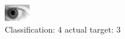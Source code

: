\begin{figure}[h!]
\begin{center}
\includegraphics[width=0.60\columnwidth]{figures/ID305_class_4_target_3.png}
\end{center}
\caption{ Classification: 4 actual target: 3}
\label{fig:ID305_class_4_target_3}
\end{figure}
